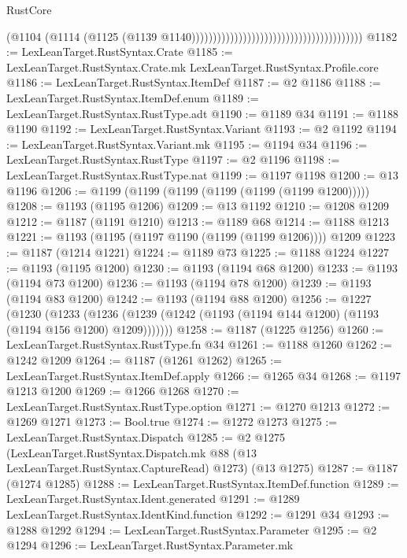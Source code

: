 \begin{lexlean}{RustCore}
\begin{coremodule}
                                                                            (@1104
                                                                              (@1114
                                                                                (@1125
                                                                                  (@1139
                                                                                    @1140))))))))))))))))))))))))))))))))))))))))
@1182 := LexLeanTarget.RustSyntax.Crate
@1185 := LexLeanTarget.RustSyntax.Crate.mk LexLeanTarget.RustSyntax.Profile.core
@1186 := LexLeanTarget.RustSyntax.ItemDef
@1187 := @2 @1186
@1188 := LexLeanTarget.RustSyntax.ItemDef.enum
@1189 := LexLeanTarget.RustSyntax.RustType.adt
@1190 := @1189 @34
@1191 := @1188 @1190
@1192 := LexLeanTarget.RustSyntax.Variant
@1193 := @2 @1192
@1194 := LexLeanTarget.RustSyntax.Variant.mk
@1195 := @1194 @34
@1196 := LexLeanTarget.RustSyntax.RustType
@1197 := @2 @1196
@1198 := LexLeanTarget.RustSyntax.RustType.nat
@1199 := @1197 @1198
@1200 := @13 @1196
@1206 := @1199 (@1199 (@1199 (@1199 (@1199 (@1199 @1200)))))
@1208 := @1193 (@1195 @1206)
@1209 := @13 @1192
@1210 := @1208 @1209
@1212 := @1187 (@1191 @1210)
@1213 := @1189 @68
@1214 := @1188 @1213
@1221 := @1193 (@1195 (@1197 @1190 (@1199 (@1199 @1206)))) @1209
@1223 := @1187 (@1214 @1221)
@1224 := @1189 @73
@1225 := @1188 @1224
@1227 := @1193 (@1195 @1200)
@1230 := @1193 (@1194 @68 @1200)
@1233 := @1193 (@1194 @73 @1200)
@1236 := @1193 (@1194 @78 @1200)
@1239 := @1193 (@1194 @83 @1200)
@1242 := @1193 (@1194 @88 @1200)
@1256 := @1227
    (@1230
      (@1233 (@1236 (@1239 (@1242 (@1193 (@1194 @144 @1200) (@1193 (@1194 @156 @1200) @1209)))))))
@1258 := @1187 (@1225 @1256)
@1260 := LexLeanTarget.RustSyntax.RustType.fn @34
@1261 := @1188 @1260
@1262 := @1242 @1209
@1264 := @1187 (@1261 @1262)
@1265 := LexLeanTarget.RustSyntax.ItemDef.apply
@1266 := @1265 @34
@1268 := @1197 @1213 @1200
@1269 := @1266 @1268
@1270 := LexLeanTarget.RustSyntax.RustType.option
@1271 := @1270 @1213
@1272 := @1269 @1271
@1273 := Bool.true
@1274 := @1272 @1273
@1275 := LexLeanTarget.RustSyntax.Dispatch
@1285 := @2
    @1275
    (LexLeanTarget.RustSyntax.Dispatch.mk @88 (@13 LexLeanTarget.RustSyntax.CaptureRead) @1273)
    (@13 @1275)
@1287 := @1187 (@1274 @1285)
@1288 := LexLeanTarget.RustSyntax.ItemDef.function
@1289 := LexLeanTarget.RustSyntax.Ident.generated
@1291 := @1289 LexLeanTarget.RustSyntax.IdentKind.function
@1292 := @1291 @34
@1293 := @1288 @1292
@1294 := LexLeanTarget.RustSyntax.Parameter
@1295 := @2 @1294
@1296 := LexLeanTarget.RustSyntax.Parameter.mk

\end{coremodule}
\end{lexlean}
